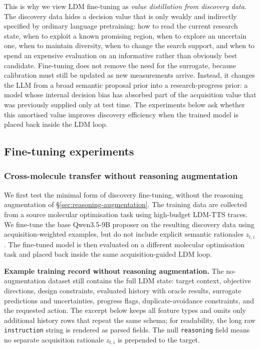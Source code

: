 This is why we view LDM fine-tuning as \emph{value distillation from discovery data}. The discovery data hides
a decision value that is only weakly and indirectly specified by ordinary language pretraining: how to read the
current research state, when to exploit a known promising region, when to explore an uncertain one, when to
maintain diversity, when to change the search support, and when to spend an expensive evaluation on an
informative rather than obviously best candidate. Fine-tuning does not remove the need for the surrogate,
because calibration must still be updated as new measurements arrive. Instead, it changes the LLM from a broad
semantic proposal prior into a research-progress prior: a model whose internal decision bias has absorbed part
of the acquisition value that was previously supplied only at test time. The experiments below ask whether this
amortised value improves discovery efficiency when the trained model is placed back inside the LDM loop.

\subsection{Fine-tuning experiments}
\label{sec:finetune-experiments}

\subsubsection{Cross-molecule transfer without reasoning augmentation}
\label{sec:finetune-no-augmentation}

We first test the minimal form of discovery fine-tuning, without the reasoning augmentation of
\S\ref{sec:reasoning-augmentation}. The training data are collected from a source molecular optimisation task
using high-budget LDM-TTS traces. We fine-tune the base Qwen3.5-9B proposer on the resulting discovery data
using acquisition-weighted examples, but do not include explicit semantic rationales $z_{t,i}$. The fine-tuned
model is then evaluated on a different molecular optimisation task and placed back inside the same
acquisition-guided LDM loop.

\textbf{Example training record without reasoning augmentation.}
The no-augmentation dataset still contains the full LDM state: target context, objective directions, design
constraints, evaluated history with oracle results, surrogate predictions and uncertainties, progress flags,
duplicate-avoidance constraints, and the requested action. The excerpt below keeps all feature types and omits
only additional history rows that repeat the same schema; for readability, the long raw \texttt{instruction}
string is rendered as parsed fields. The null \texttt{reasoning} field means no separate acquisition rationale
$z_{t,i}$ is prepended to the target.

